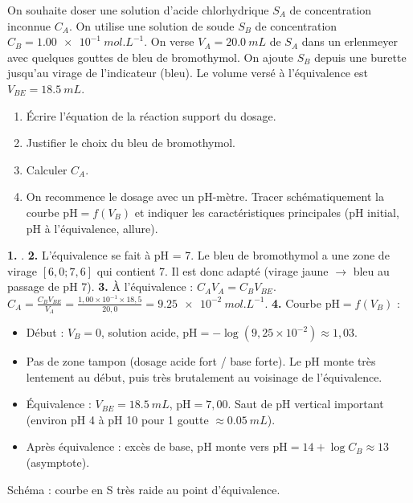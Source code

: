 \documentclass[11pt]{article}
\begin{document}
\begin{exercice}
On souhaite doser une solution d'acide chlorhydrique $S_A$ de concentration inconnue $C_A$. On utilise une solution de soude $S_B$ de concentration $C_B = \SI{1,00e-1}{mol.L^{-1}}$. On verse $V_A = \SI{20,0}{mL}$ de $S_A$ dans un erlenmeyer avec quelques gouttes de bleu de bromothymol. On ajoute $S_B$ depuis une burette jusqu'au virage de l'indicateur (bleu). Le volume versé à l'équivalence est $V_{BE} = \SI{18,5}{mL}$.
\begin{enumerate}
\item Écrire l'équation de la réaction support du dosage.
\item Justifier le choix du bleu de bromothymol.
\item Calculer $C_A$.
\item On recommence le dosage avec un pH-mètre. Tracer schématiquement la courbe $\text{pH} = f(V_B)$ et indiquer les caractéristiques principales (pH initial, pH à l'équivalence, allure).
\end{enumerate}
\end{exercice}

\begin{corrige}
\textbf{1.} .
\textbf{2.} L'équivalence se fait à pH = 7. Le bleu de bromothymol a une zone de virage $[6,0 ; 7,6]$ qui contient 7. Il est donc adapté (virage jaune $\to$ bleu au passage de pH 7).
\textbf{3.} À l'équivalence : $C_A V_A = C_B V_{BE}$.
$C_A = \frac{C_B V_{BE}}{V_A} = \frac{1,00\times10^{-1} \times 18,5}{20,0} = \SI{9,25e-2}{mol.L^{-1}}$.
\textbf{4.} Courbe $\text{pH} = f(V_B)$ :
\begin{itemize}
\item Début : $V_B=0$, solution acide, $\text{pH} = -\log(9,25\times10^{-2}) \approx 1,03$.
\item Pas de zone tampon (dosage acide fort / base forte). Le pH monte très lentement au début, puis très brutalement au voisinage de l'équivalence.
\item Équivalence : $V_{BE} = \SI{18,5}{mL}$, $\text{pH} = 7,00$. Saut de pH vertical important (environ pH 4 à pH 10 pour 1 goutte $\approx \SI{0,05}{mL}$).
\item Après équivalence : excès de base, pH monte vers $\text{pH} = 14 + \log C_B \approx 13$ (asymptote).
\end{itemize}
Schéma : courbe en S très raide au point d'équivalence.
\end{corrige}
\end{document}
